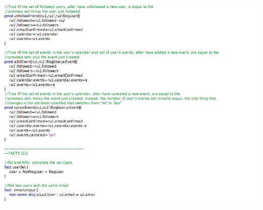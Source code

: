 \documentclass[12pt]{book}
\begin{document}
\includegraphics[width=19cm,height=21cm]{Alloy5}\\
\newpage
\end{document}
